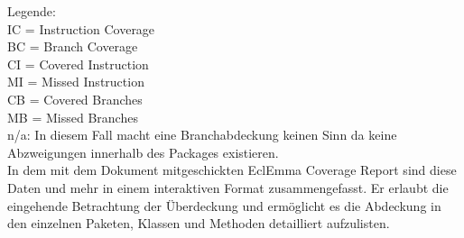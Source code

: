 Legende: \\
	IC = Instruction Coverage \\
	BC = Branch Coverage \\
	CI = Covered Instruction \\
	MI = Missed Instruction \\
	CB = Covered Branches \\
	MB = Missed Branches \\
	n/a: In diesem Fall macht eine Branchabdeckung keinen Sinn da keine Abzweigungen innerhalb des Packages existieren. \\

In dem mit dem Dokument mitgeschickten EclEmma Coverage Report sind diese Daten und mehr in einem interaktiven Format zusammengefasst. 
Er erlaubt die eingehende Betrachtung der Überdeckung und ermöglicht es die Abdeckung in den einzelnen Paketen, Klassen und Methoden detailliert aufzulisten.
